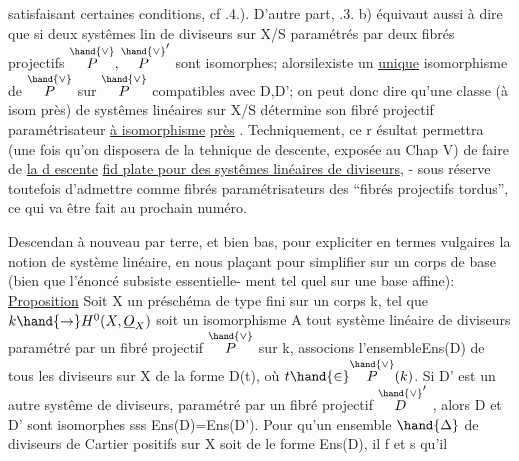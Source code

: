 
satisfaisant certaines conditions, cf .4.). D'autre part, .3. b)
équivaut  aussi à dire que  si deux systêmes lin de diviseurs
sur X/S  paramétrés par deux fibrés projectifs $\overset{\hand{\vee}}{P},\overset{\hand{\vee}}{P}'$ sont isomorphes;
alorsilexiste un \uline{unique} isomorphisme de $\overset{\hand{\vee}}{P}$ sur $\overset{\hand{\vee}}{P}$ compatibles avec D,D';
on peut donc dire qu'une classe (à isom près) de systêmes linéaires sur
X/S détermine son fibré projectif paramétrisateur \uline{à isomorphisme} 
\uline{près} . Techniquement, ce r ésultat permettra (une fois qu'on disposera
de la tehnique de descente, exposée au Chap V) de faire de \uline{la d escente}
\uline{fid plate pour des systêmes linéaires de diviseurs}, - sous réserve
 toutefois d'admettre  comme fibrés paramétrisateurs des ``fibrés projectifs
tordus'', ce qui va être fait au prochain  numéro.

Descendan à nouveau par terre, et bien bas, pour expliciter en
termes vulgaires la notion de système linéaire, en nous plaçant pour
simplifier sur un corps de base (bien que l'énoncé subsiste essentielle-%
ment tel quel sur une base affine):
\uline{Proposition}  Soit X un préschéma   de type fini sur un corps k,
tel que $k\hand{\to} H^0(X,\underline{O}_X)$ soit un isomorphisme A tout système linéaire  de
diviseurs   paramétré par un fibré projectif $\overset{\hand{\vee}}{P}$ sur k, associons
l'ensemble\hand{(!)}Ens(D) de tous les diviseurs sur X de la forme D(t), où
$t\hand{\in}\overset{\hand{\vee}}{P}(k)$.  Si  D' est un autre systême  de diviseurs, paramétré par un
fibré projectif $\overset{\hand{\vee}}{D}'$ , alors D et D' sont isomorphes sss Ens(D)=Ens(D').
 
\hand{(}Pour qu'un ensemble $\hand{\Delta}$ de diviseurs de Cartier positifs sur X soit de
le forme Ens(D), il f et s qu'il  

